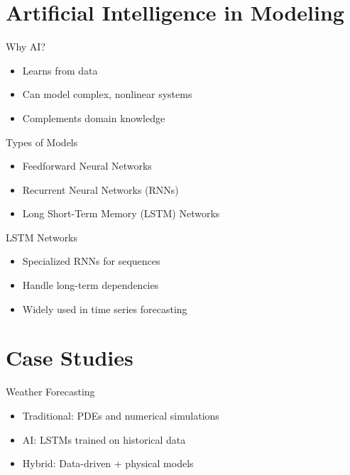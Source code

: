 \documentclass[xcolor=table]{beamer}
\begin{document}
\section{Artificial Intelligence in Modeling}

\begin{frame}{Why AI?}
    \begin{itemize}
        \item Learns from data
        \item Can model complex, nonlinear systems
        \item Complements domain knowledge
    \end{itemize}
\end{frame}

\begin{frame}{Types of Models}
    \begin{itemize}
        \item Feedforward Neural Networks
        \item Recurrent Neural Networks (RNNs)
        \item Long Short-Term Memory (LSTM) Networks
    \end{itemize}
\end{frame}

\begin{frame}{LSTM Networks}
    \begin{itemize}
        \item Specialized RNNs for sequences
        \item Handle long-term dependencies
        \item Widely used in time series forecasting
    \end{itemize}
\end{frame}

\section{Case Studies}

\begin{frame}{Weather Forecasting}
    \begin{itemize}
        \item Traditional: PDEs and numerical simulations
        \item AI: LSTMs trained on historical data
        \item Hybrid: Data-driven + physical models
    \end{itemize}
\end{frame}
\end{document}
